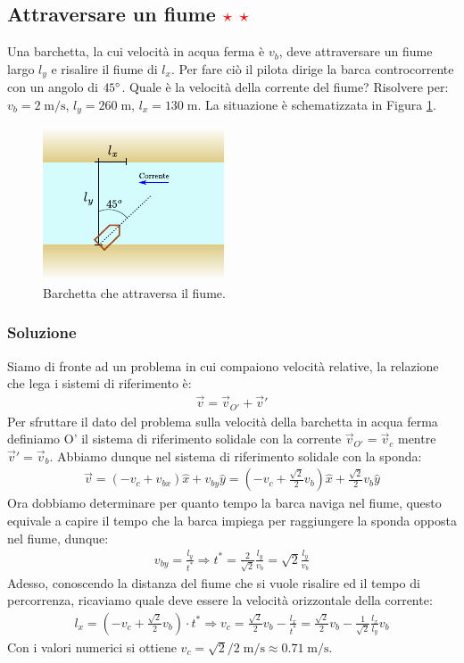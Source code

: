 \documentclass[12pt,a4paper]{book}
\newcommand{\rstar}{ \textcolor{red}{$\star$}}
\begin{document}
\subsection{Attraversare un fiume \rstar\rstar}
Una barchetta, la cui velocità in acqua ferma è $v_b$, deve attraversare un fiume largo $l_y$ e risalire il fiume di $l_x$. Per fare ciò il pilota dirige la barca controcorrente con un angolo di $45\degree$. Quale è la velocità della corrente del fiume? Risolvere per: $v_b=2\;\text{m/s}$, $l_y=260\;\text{m}$, $l_x=130\;\text{m}$. La situazione è schematizzata in Figura \ref{fig:river}.

\begin{figure}[!ht]
 \centering
\includegraphics[scale=2]{river.pdf}
\caption{Barchetta che attraversa il fiume.  \label{fig:river} }
\end{figure}

\subsubsection*{Soluzione}
Siamo di fronte ad un problema in cui compaiono velocità relative, la relazione che lega i sistemi di riferimento è:
%
\begin{gather*}
\vec{v}=\vec{v}_{O'}+\vec{v}'
\end{gather*}
%
Per sfruttare il dato del problema sulla velocità della barchetta in acqua ferma definiamo O' il sistema di riferimento solidale con la corrente $\vec{v}_{O'}=\vec{v}_{c}$ mentre $\vec{v}'=\vec{v}_b$. Abbiamo dunque nel sistema di riferimento solidale con la sponda:
%
\begin{gather*}
\vec{v}=(-v_c+v_{bx})\hat{x}+v_{by}\hat{y}=(-v_c+\frac{\sqrt{2}}{2}v_{b})\hat{x}+\frac{\sqrt{2}}{2}v_{b}\hat{y}
\end{gather*}
%
Ora dobbiamo determinare per quanto tempo la barca naviga nel fiume, questo equivale a capire il tempo che la barca impiega per raggiungere la sponda opposta nel fiume, dunque:
%
\begin{gather*}
v_{by}=\frac{l_y}{t^*} \Rightarrow t^*=\frac{2}{\sqrt{2}}\frac{l_y}{v_b}=\sqrt{2}\frac{l_y}{v_b}
\end{gather*}
%
Adesso, conoscendo la distanza del fiume che si vuole risalire ed il tempo di percorrenza, ricaviamo quale deve essere la velocità orizzontale della corrente:
%
\begin{gather*}
l_x=(-v_c+\frac{\sqrt{2}}{2}v_{b})\cdot t^* \Rightarrow v_c=\frac{\sqrt{2}}{2}v_b -\frac{l_x}{t^*}=\frac{\sqrt{2}}{2}v_b -\frac{1}{\sqrt{2}}\frac{l_x}{l_y}v_b
\end{gather*}
%
Con i valori numerici si ottiene $v_c=\sqrt{2}/2\;\text{m/s} \approx 0.71 \;\text{m/s}$.
\end{document}
